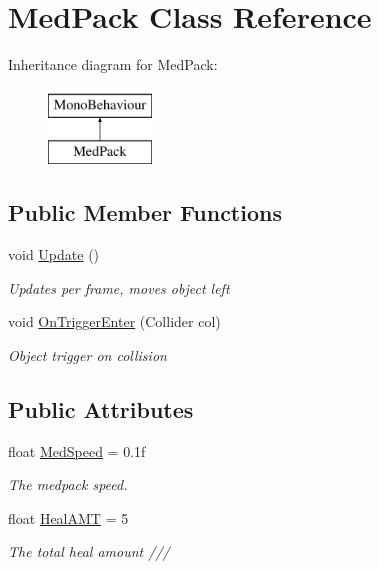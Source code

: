 \hypertarget{classMedPack}{\section{Med\-Pack Class Reference}
\label{classMedPack}
}
Inheritance diagram for Med\-Pack\-:\begin{figure}[H]
\begin{center}
\leavevmode
\includegraphics[height=2.000000cm]{classMedPack}
\end{center}
\end{figure}
\subsection*{Public Member Functions}
\begin{DoxyCompactItemize}
\item 
void \hyperlink{classMedPack_ab62bb43788d62cadf3177f763ee14820}{Update} ()
\begin{DoxyCompactList}\small\item\em Updates per frame, moves object left \end{DoxyCompactList}\item 
void \hyperlink{classMedPack_ae69e19d12dce004d6974e23aed815e7f}{On\-Trigger\-Enter} (Collider col)
\begin{DoxyCompactList}\small\item\em Object trigger on collision \end{DoxyCompactList}\end{DoxyCompactItemize}
\subsection*{Public Attributes}
\begin{DoxyCompactItemize}
\item 
float \hyperlink{classMedPack_a054a06495e6562f93eaeefed24d1d474}{Med\-Speed} = 0.\-1f
\begin{DoxyCompactList}\small\item\em The medpack speed. \end{DoxyCompactList}\item 
float \hyperlink{classMedPack_a7d896451dc580637510d0d345db611da}{Heal\-A\-M\-T} = 5
\begin{DoxyCompactList}\small\item\em The total heal amount /// \end{DoxyCompactList}\end{DoxyCompactItemize}


